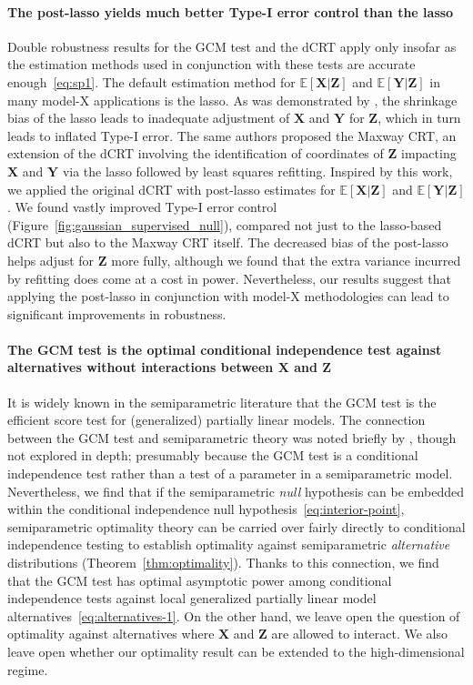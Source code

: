 \documentclass[aos]{imsart}
\theoremstyle{plain}
\theoremstyle{remark}
\newcommand{\E}{\mathbb E}								%
\newcommand{\prx}{\bm X}								%
\newcommand{\prz}{\bm Z}								%
\newcommand{\pry}{{\bm Y}}								%
\begin{document}
\paragraph*{The post-lasso yields much better Type-I error control than the lasso}

Double robustness results for the GCM test and the dCRT apply only insofar as the estimation methods used in conjunction with these tests are accurate enough~\eqref{eq:sp1}. The default estimation method for $\E[\prx|\prz]$ and $\E[\pry|\prz]$ in many model-X applications is the lasso. As was demonstrated by \cite{Li2022}, the shrinkage bias of the lasso leads to inadequate adjustment of $\prx$ and $\pry$ for $\prz$, which in turn leads to inflated Type-I error. The same authors proposed the Maxway CRT, an extension of the dCRT involving the identification of coordinates of $\prz$ impacting $\prx$ and $\pry$ via the lasso followed by least squares refitting. Inspired by this work, we applied the original dCRT with post-lasso estimates for $\E[\prx|\prz]$ and $\E[\pry|\prz]$. We found vastly improved Type-I error control (Figure~\ref{fig:gaussian_supervised_null}), compared not just to the lasso-based dCRT but also to the Maxway CRT itself. The decreased bias of the post-lasso helps adjust for $\prz$ more fully, although we found that the extra variance incurred by refitting does come at a cost in power. Nevertheless, our results suggest that applying the post-lasso in conjunction with model-X methodologies can lead to significant improvements in robustness.

\paragraph*{The GCM test is the optimal conditional independence test against alternatives without interactions between $\prx$ and $\prz$} 

It is widely known in the semiparametric literature that the GCM test is the efficient score test for (generalized) partially linear models. The connection between the GCM test and semiparametric theory was noted briefly by \citet{Shah2018}, though not explored in depth; presumably because the GCM test is a conditional independence test rather than a test of a parameter in a semiparametric model. Nevertheless, we find that if the semiparametric \textit{null} hypothesis can be embedded within the conditional independence null hypothesis~\eqref{eq:interior-point}, semiparametric optimality theory can be carried over fairly directly to conditional independence testing to establish optimality against semiparametric \textit{alternative} distributions (Theorem~\ref{thm:optimality}). Thanks to this connection, we find that the GCM test has optimal asymptotic power among conditional independence tests against local generalized partially linear model alternatives~\eqref{eq:alternatives-1}. On the other hand, we leave open the question of optimality against alternatives where $\prx$ and $\prz$ are allowed to interact. We also leave open whether our optimality result can be extended to the high-dimensional regime.
\end{document}
